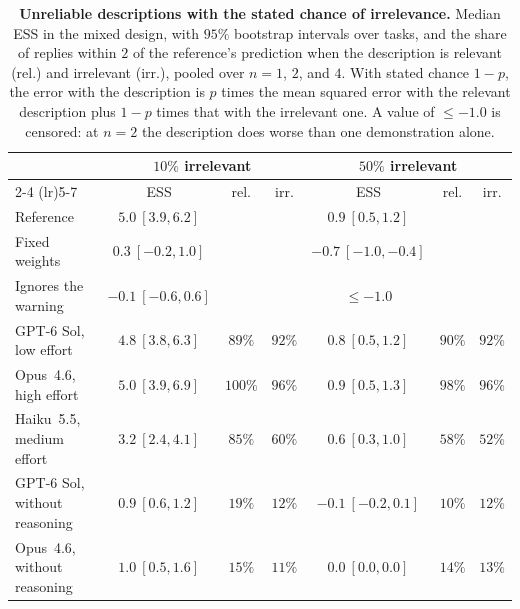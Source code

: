 \begin{table}[!htb]
\centering\small
\setlength{\tabcolsep}{3.5pt}
\caption[Unreliable descriptions with the stated chance of irrelevance]{\textbf{Unreliable descriptions with the stated chance of irrelevance.} Median ESS in the mixed design, with $95\%$ bootstrap intervals over tasks, and the share of replies within $2$ of the reference's prediction when the description is relevant (rel.) and irrelevant (irr.), pooled over $n=1$, $2$, and $4$. With stated chance $1-p$, the error with the description is $p$ times the mean squared error with the relevant description plus $1-p$ times that with the irrelevant one. A value of $\le-1.0$ is censored: at $n=2$ the description does worse than one demonstration alone.}
\label{tab:matched}
\vspace{3pt}
\begin{tabular}{lcccccc}
\toprule
& \multicolumn{3}{c}{$10\%$ irrelevant} & \multicolumn{3}{c}{$50\%$ irrelevant} \\
\cmidrule(lr){2-4} \cmidrule(lr){5-7}
& ESS & rel. & irr. & ESS & rel. & irr. \\
\midrule
Reference & $5.0\ [3.9,6.2]$ & & & $0.9\ [0.5,1.2]$ & & \\
Fixed weights & $0.3\ [-0.2,1.0]$ & & & $-0.7\ [-1.0,-0.4]$ & & \\
Ignores the warning & $-0.1\ [-0.6,0.6]$ & & & $\le-1.0$ & & \\
\midrule
GPT-6 Sol, low effort & $4.8\ [3.8,6.3]$ & $89\%$ & $92\%$ & $0.8\ [0.5,1.2]$ & $90\%$ & $92\%$ \\
Opus~4.6, high effort & $5.0\ [3.9,6.9]$ & $100\%$ & $96\%$ & $0.9\ [0.5,1.3]$ & $98\%$ & $96\%$ \\
Haiku~5.5, medium effort & $3.2\ [2.4,4.1]$ & $85\%$ & $60\%$ & $0.6\ [0.3,1.0]$ & $58\%$ & $52\%$ \\
GPT-6 Sol, without reasoning & $0.9\ [0.6,1.2]$ & $19\%$ & $12\%$ & $-0.1\ [-0.2,0.1]$ & $10\%$ & $12\%$ \\
Opus~4.6, without reasoning & $1.0\ [0.5,1.6]$ & $15\%$ & $11\%$ & $0.0\ [0.0,0.0]$ & $14\%$ & $13\%$ \\
\bottomrule
\end{tabular}
\end{table}

